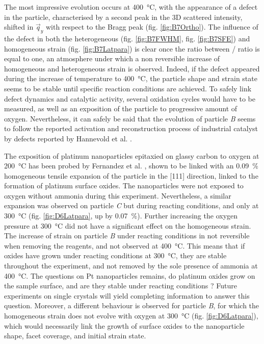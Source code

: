 The most impressive evolution occurs at \qty{400}{\degreeCelsius}, with the appearance of a defect in the particle, characterised by a second peak in the 3D scattered intensity, shifted in $\vec{q}_y$ with respect to the Bragg peak (fig. \ref{fig:B7Ortho}).
The influence of the defect in both the heterogeneous (fig. \ref{fig:B7FWHM}, fig. \ref{fig:B7SFE}) and homogeneous strain (fig. \ref{fig:B7Latpara}) is clear once the ratio between / ratio is equal to one, an atmosphere under which a non reversible increase of homogeneous and heterogeneous strain is observed.
Indeed, if the defect appeared during the increase of temperature to \qty{400}{\degreeCelsius}, the particle shape and strain state seems to be stable until specific reaction conditions are achieved.
To safely link defect dynamics and catalytic activity, several oxidation cycles would have to be measured, as well as an exposition of the particle to progressive amount of oxygen.
Nevertheless, it can safely be said that the evolution of particle \textit{B} seems to follow the reported activation and reconstruction process of industrial catalyst by defects reported by Hannevold et al. \parencite*{Hannevold2005}.

The exposition of platinum nanoparticles epitaxied on glassy carbon to oxygen at \qty{200}{\degreeCelsius} has been probed by Fernandez et al. \parencite*{Fernandez2019}, shown to be linked with an \qty{0.09}{\percent} homogeneous tensile expansion of the particle in the [111] direction, linked to the formation of platinum surface oxides.
The nanoparticles were not exposed to oxygen without ammonia during this experiment.
Nevertheless, a similar expansion was observed on particle \textit{C} but during reacting conditions, and only at \qty{300}{\degreeCelsius} (fig. \ref{fig:D6Latpara}, up by \qty{0.07}{\percent}).
Further increasing the oxygen pressure at \qty{300}{\degreeCelsius} did not have a significant effect on the homogeneous strain.
The increase of strain on particle \textit{B} under reacting conditions in not reversible when removing the reagents, and not observed at \qty{400}{\degreeCelsius}.
This means that if oxides have grown under reacting conditions at \qty{300}{\degreeCelsius}, they are stable throughout the experiment, and not removed by the sole presence of ammonia at \qty{400}{\degreeCelsius}.
The questions on Pt nanoparticles remains, do platinum oxides grow on the sample surface, and are they stable under reacting conditions ?
Future experiments on single crystals will yield completing information to answer this question.
Moreover, a different behaviour is observed for particle \textit{B}, for which the homogeneous strain does not evolve with oxygen at \qty{300}{\degreeCelsius} (fig. \ref{fig:D6Latpara}), which would necessarily link the growth of surface oxides to the nanoparticle shape, facet coverage, and initial strain state.


